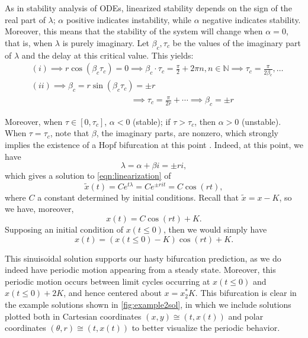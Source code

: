 \documentclass[12pt]{article}
\begin{document}
As in stability analysis of ODEs, linearized stability depends on the sign of the real part of $\lambda$; $\alpha$ positive indicates instability, while $\alpha$ negative indicates stability. Moreover, this means that the stability of the system will change when $\alpha = 0$, that is, when $\lambda$ is purely imaginary. Let $\beta_c, \tau_c$ be the values of the imaginary part of $\lambda$ and the delay at this critical value. This yields:
\begin{align*}
    &(i)\implies r \cos (\beta_c \tau_c) = 0\implies \beta_c\cdot \tau_c = \frac{\pi}{2} + 2\pi n, n \in \mathbb{N} \implies \tau_c = \frac{\pi}{2 \beta_c},\dots\\
    &(ii) \implies \beta_c = r \sin (\beta_c \tau_c) = \pm r \\
    &\hspace{12em}\implies \tau_c = \frac{\pi}{2 r} + \cdots \implies \beta_c = \pm r
\end{align*}

Moreover, when $\tau \in [0, \tau_c]$, $\alpha < 0$ (stable); if $\tau > \tau_c$, then $\alpha > 0$ (unstable). When $\tau = \tau_c$, note that $\beta$, the imaginary parts, are nonzero, which strongly implies the existence of a Hopf bifurcation at this point \cite{scientificcomputing}. Indeed, at this point, we have \[
\lambda = \alpha + \beta i = \pm r i,
\]
which gives a solution to \cref{eqn:linearization} of \begin{equation}
    \tilde{x}(t) = Ce^{t \lambda} = Ce^{\pm r i t} = C \cos (rt),
\end{equation}
where $C$ a constant determined by initial conditions. Recall that $\tilde{x} = x - K$, so we have, moreover, \begin{equation*}\label{eqn:solutionhopf}
    x(t) = C \cos (rt) + K.
\end{equation*}
Supposing an initial condition of $x(t \leq 0)$, then we would simply have \[
x(t) = (x(t \leq 0) - K) \cos (rt) + K.   
\]

This sinuisoidal solution supports our hasty bifurcation prediction, as we do indeed have periodic motion appearing from a steady state. Moreover, this periodic motion occurs between limit cycles occurring at $x(t \leq 0)$ and $x(t\leq 0) + 2K$, and hence centered about $x = x^*_2 K$. This bifurcation is clear in the example solutions shown in \cref{fig:example2sol}, in which we include solutions plotted both in Cartesian coordinates $(x, y) \cong (t, x(t))$ and polar coordinates $(\theta, r) \cong (t, x(t))$ to better visualize the periodic behavior.
\end{document}
